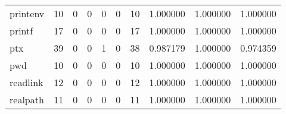 \begin{tabular}{lrrrrrrrrr}
printenv  &                                      10 &                                                  0 &                                                  0 &                                                  0 &                                                  0 &                                                 10 &                                           1.000000 &                               1.000000 &                             1.000000 \\
printf    &                                      17 &                                                  0 &                                                  0 &                                                  0 &                                                  0 &                                                 17 &                                           1.000000 &                               1.000000 &                             1.000000 \\
ptx       &                                      39 &                                                  0 &                                                  0 &                                                  1 &                                                  0 &                                                 38 &                                           0.987179 &                               1.000000 &                             0.974359 \\
pwd       &                                      10 &                                                  0 &                                                  0 &                                                  0 &                                                  0 &                                                 10 &                                           1.000000 &                               1.000000 &                             1.000000 \\
readlink  &                                      12 &                                                  0 &                                                  0 &                                                  0 &                                                  0 &                                                 12 &                                           1.000000 &                               1.000000 &                             1.000000 \\
realpath  &                                      11 &                                                  0 &                                                  0 &                                                  0 &                                                  0 &                                                 11 &                                           1.000000 &                               1.000000 &                             1.000000 \\

\end{tabular}
